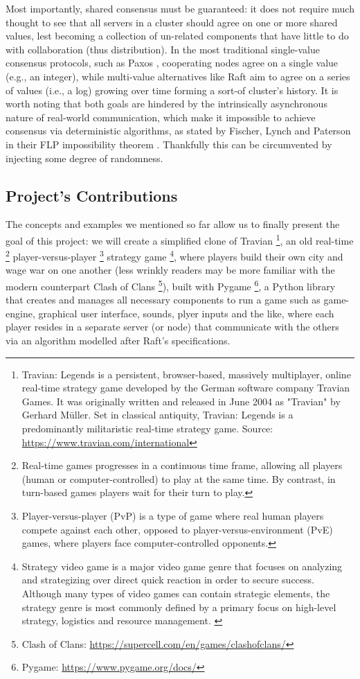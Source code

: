 Most importantly, shared consensus must be guaranteed: it does not require much thought to see that all servers in a cluster should agree on one or more shared values, lest becoming a collection of un-related components that have little to do with collaboration (thus distribution). In the most traditional single-value consensus protocols, such as Paxos \cite{paxos}, cooperating nodes agree on a single value (e.g., an integer), while multi-value alternatives like Raft \cite{raft} aim to agree on a series of values (i.e., a log) growing over time forming a sort-of cluster's history. It is worth noting that both goals are hindered by the intrinsically asynchronous nature of real-world communication, which make it impossible to achieve consensus via deterministic algorithms, as stated by Fischer, Lynch and Paterson in their FLP impossibility theorem \cite{flp}. Thankfully this can be circumvented by injecting some degree of randomness.

\subsection{Project's Contributions}

The concepts and examples we mentioned so far allow us to finally present the goal of this project: we will create a simplified clone of Travian \footnote{Travian: Legends is a persistent, browser-based, massively multiplayer, online real-time strategy game developed by the German software company Travian Games. It was originally written and released in June 2004 as "Travian" by Gerhard Müller. Set in classical antiquity, Travian: Legends is a predominantly militaristic real-time strategy game. Source: \url{https://www.travian.com/international}}, an old real-time \footnote{Real-time games progresses in a continuous time frame, allowing all players (human or computer-controlled) to play at the same time. By contrast, in turn-based games players wait for their turn to play.} player-versus-player \footnote{Player-versus-player (PvP) is a type of game where real human players compete against each other, opposed to player-versus-environment (PvE) games, where players face computer-controlled opponents.} strategy game \footnote{Strategy video game is a major video game genre that focuses on analyzing and strategizing over direct quick reaction in order to secure success. Although many types of video games can contain strategic elements, the strategy genre is most commonly defined by a primary focus on high-level strategy, logistics and resource management. \cite{rollings2003andrew}}, where players build their own city and wage war on one another (less wrinkly readers may be more familiar with the modern counterpart Clash of Clans \footnote{Clash of Clans: \url{https://supercell.com/en/games/clashofclans/}}), built with Pygame \footnote{Pygame: \url{https://www.pygame.org/docs/}}, a Python library that creates and manages all necessary components to run a game such as game-engine, graphical user interface, sounds, plyer inputs and the like, where each player resides in a separate server (or node) that communicate with the others via an algorithm modelled after Raft's specifications. 

